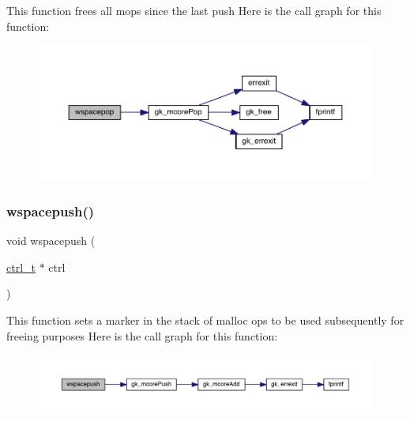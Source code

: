 This function frees all mops since the last push Here is the call graph for this function\+:\nopagebreak
\begin{figure}[H]
\begin{center}
\leavevmode
\includegraphics[width=350pt]{a00981_ad26c08175b8b18d7dfb86f2f8d91b09e_cgraph}
\end{center}
\end{figure}
\mbox{\label{a00981_a90d838f5af71d196b117d443432e4646}} 
\subsubsection{\texorpdfstring{wspacepush()}{wspacepush()}}
{\footnotesize\ttfamily void wspacepush (\begin{DoxyParamCaption}\item[{\hyperlink{a00742}{ctrl\+\_\+t} $\ast$}]{ctrl }\end{DoxyParamCaption})}

This function sets a marker in the stack of malloc ops to be used subsequently for freeing purposes Here is the call graph for this function\+:\nopagebreak
\begin{figure}[H]
\begin{center}
\leavevmode
\includegraphics[width=350pt]{a00981_a90d838f5af71d196b117d443432e4646_cgraph}
\end{center}
\end{figure}
